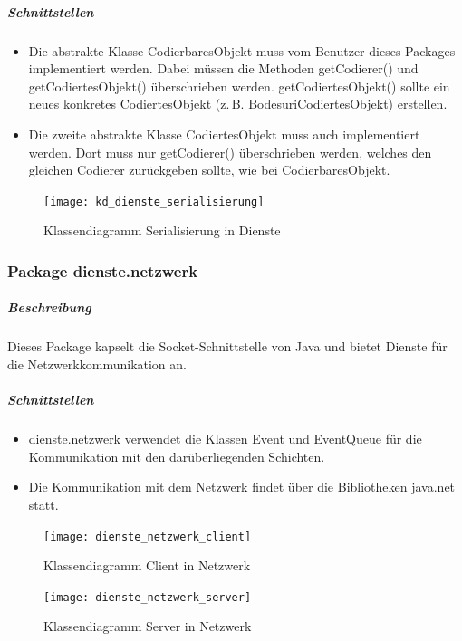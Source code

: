 \documentclass[12pt,halfparskip]{scrartcl}
\begin{document}
\subparagraph{Schnittstellen}
\begin{itemize}
	\item Die abstrakte Klasse CodierbaresObjekt muss vom Benutzer dieses Packages implementiert werden. Dabei müssen die Methoden getCodierer() und getCodiertesObjekt() überschrieben werden. getCodiertesObjekt() sollte ein neues konkretes CodiertesObjekt (z.\,B. BodesuriCodiertesObjekt) erstellen.
	\item Die zweite abstrakte Klasse CodiertesObjekt muss auch implementiert werden. Dort muss nur getCodierer() überschrieben werden, welches den gleichen Codierer zurückgeben sollte, wie bei CodierbaresObjekt.
\end{itemize}

\begin{figure}[h]
	\centering
	\texttt{[image: kd\_dienste\_serialisierung]}
	\caption{Klassendiagramm Serialisierung in Dienste}
	\label{fig:kd_dienste_serialisierung}
\end{figure}

\clearpage
\subsubsection{Package dienste.netzwerk} %
\label{ssub:package_dienste_netzwerk}
\subparagraph{Beschreibung}
Dieses Package kapselt die Socket-Schnittstelle von Java und bietet Dienste für die Netzwerkkommunikation an.

\subparagraph{Schnittstellen} %
\label{ssub:schnittstellen}
\begin{itemize}
	\item dienste.netzwerk verwendet die Klassen Event und EventQueue für die Kommunikation mit den darüberliegenden Schichten.
	\item Die Kommunikation mit dem Netzwerk findet über die Bibliotheken java.net statt.
\end{itemize}

\begin{figure}[h]
	\centering
	\texttt{[image: dienste\_netzwerk\_client]}
	\caption{Klassendiagramm Client in Netzwerk}
	\label{fig:dienste_netzwerk_client}
\end{figure}

\begin{figure}[h]
	\centering
	\texttt{[image: dienste\_netzwerk\_server]}
	\caption{Klassendiagramm Server in Netzwerk}
	\label{fig:dienste_netzwerk_server}
\end{figure}
\end{document}

